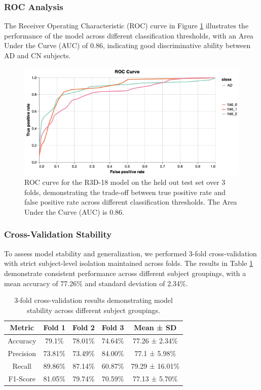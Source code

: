 \documentclass[12pt, a4paper]{article}
\begin{document}
\subsubsection{ROC Analysis}

The Receiver Operating Characteristic (ROC) curve in Figure \ref{fig:roc_curve} illustrates the performance of the model across different classification thresholds, with an Area Under the Curve (AUC) of 0.86, indicating good discriminative ability between AD and CN subjects.

\begin{figure}[htbp]
  \centering
  \includegraphics[width=\textwidth]{figures/ROC3F.png}
  \caption{ROC curve for the R3D-18 model on the held out test set over 3 folds, demonstrating the trade-off between true positive rate and false positive rate across different classification thresholds. The Area Under the Curve (AUC) is 0.86.}
  \label{fig:roc_curve}
\end{figure}

\subsubsection{Cross-Validation Stability}

To assess model stability and generalization, we performed 3-fold cross-validation with strict subject-level isolation maintained across folds. The results in Table \ref{tab:cross_validation} demonstrate consistent performance across different subject groupings, with a mean accuracy of 77.26\% and standard deviation of 2.34\%.

\begin{table}[htbp]
\centering
\begin{tabular}{|c|c|c|c|c|}
\hline
\textbf{Metric} & \textbf{Fold 1} & \textbf{Fold 2} & \textbf{Fold 3} & \textbf{Mean ± SD} \\
\hline
Accuracy & 79.1\% & 78.01\% & 74.64\% & 77.26 ± 2.34\% \\
\hline
Precision & 73.81\% & 73.49\% & 84.00\% & 77.1 ± 5.98\% \\
\hline
Recall & 89.86\% & 87.14\% & 60.87\% & 79.29 ± 16.01\% \\
\hline
F1-Score & 81.05\% & 79.74\% & 70.59\% & 77.13 ± 5.70\% \\
\hline
\end{tabular}
\caption{3-fold cross-validation results demonstrating model stability across different subject groupings.}
\label{tab:cross_validation}
\end{table}
\end{document}
